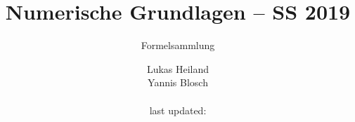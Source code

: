 \documentclass{scrartcl}
\begin{document}
	
	
	\title{Numerische Grundlagen -- SS 2019}
	\subtitle{Formelsammlung}
	\author{Lukas Heiland\\Yannis Blosch \\\\ last updated:}
	
	\maketitle
	
	\pagebreak
	
	\setcounter{tocdepth}{2}	
	\tableofcontents
	
	\pagebreak
	
	
	
	\pagebreak
	
	
	
	
	
\end{document}
